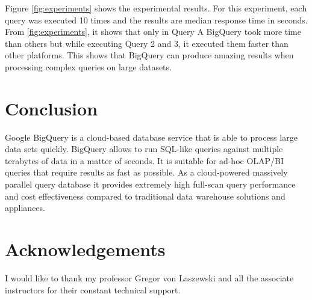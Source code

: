 \documentclass[9pt,twocolumn,twoside]{../../styles/osajnl}
\begin{document}
\noindent
Figure \ref{fig:experiments} shows the experimental results. For this
experiment, each query was executed 10 times and the results are
median response time in seconds. From \ref{fig:experiments}, it shows
that only in Query A BigQuery took more time than others but while
executing Query 2 and 3, it executed them faster than other
platforms. This shows that BigQuery can produce amazing results when
processing complex queries on large datasets.

\section{Conclusion}
Google BigQuery is a cloud-based database service that is able to
process large data sets quickly. BigQuery allows to run SQL-like
queries against multiple terabytes of data in a matter of seconds. It
is suitable for ad-hoc OLAP/BI queries that require results as fast as
possible. As a cloud-powered massively parallel query database it
provides extremely high full-scan query performance and cost
effectiveness compared to traditional data warehouse solutions and
appliances.

\section*{Acknowledgements}

I would like to thank my professor Gregor von Laszewski and all the
associate instructors for their constant technical support.



 
\newpage

\appendix
\end{document}
